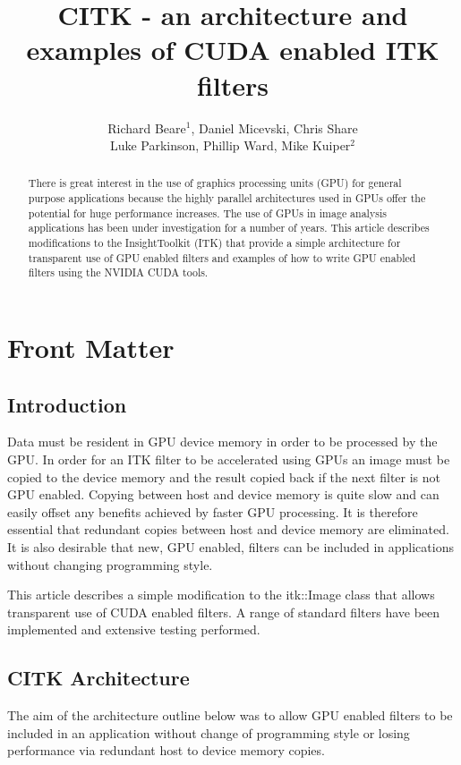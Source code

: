 \documentclass{InsightArticle}
\title{CITK - an architecture and examples of CUDA enabled ITK filters}
\author{Richard Beare{$^1$}, Daniel Micevski, Chris Share\\Luke Parkinson, Phillip Ward, Mike Kuiper{$^2$}}
\begin{document}
\maketitle

\ifhtml
\chapter*{Front Matter\label{front}}
\fi


\begin{abstract}
\noindent
There is great interest in the use of graphics processing units (GPU)
for general purpose applications because the highly parallel
architectures used in GPUs offer the potential for huge performance
increases. The use of GPUs in image analysis applications has been
under investigation for a number of years. This article describes
modifications to the InsightToolkit (ITK) that provide a simple
architecture for transparent use of GPU enabled filters and examples
of how to write GPU enabled filters using the NVIDIA CUDA tools.
\end{abstract}

\tableofcontents

\section{Introduction}
Data must be resident in GPU device memory in order to be processed by
the GPU. In order for an ITK filter to be accelerated using GPUs an
image must be copied to the device memory and the result copied back
if the next filter is not GPU enabled. Copying between host and device
memory is quite slow and can easily offset any benefits achieved by
faster GPU processing. It is therefore essential that redundant copies
between host and device memory are eliminated. It is also desirable
that new, GPU enabled, filters can be included in applications without
changing programming style.

This article describes a simple modification to the itk::Image class
that allows transparent use of CUDA enabled filters. A range of
standard filters have been implemented and extensive testing
performed.

\section{CITK Architecture}
The aim of the architecture outline below was to allow GPU enabled
filters to be included in an application without change of programming
style or losing performance via redundant host to device memory copies.
\end{document}
